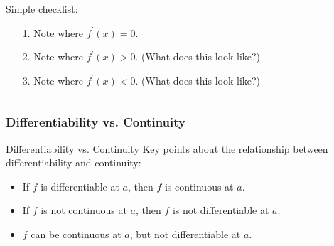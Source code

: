\documentclass[Cal1Spr16Lectures.tex]{subfiles}
\begin{document}
\begin{frame}\footnotesize
\begin{ex}
\vspace{0.75pc}
\begin{columns}[T]
\begin{column}{0.45\textwidth}
	Simple checklist:
	\begin{itemize}
	\item[1.] Note where $f^{\prime}(x)=0$.
	\item[2.]  Note where $f^{\prime}(x)>0$.  (What does this look like?)
	\item[3.]  Note where $f^{\prime}(x)<0$.  (What does this look like?)
	\end{itemize}
\end{column}
\begin{column}{0.5\textwidth}	
\end{column}
\end{columns}
\end{ex}	
\end{frame}

\subsubsection{Differentiability vs. Continuity}

\begin{frame}{\small Differentiability vs. Continuity}
Key points about the relationship between differentiability and continuity:
\begin{itemize}
\item If $f$ is differentiable at $a$, then $f$ is continuous at $a$.
\item If $f$ is not continuous at $a$, then $f$ is not differentiable at $a$.
\item $f$ can be continuous at $a$, but not differentiable at $a$.
\end{itemize}
\end{frame}
\end{document}
